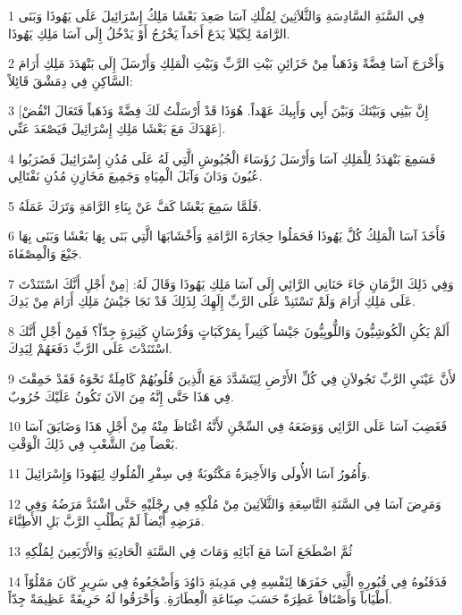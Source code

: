 \par 1 فِي السَّنَةِ السَّادِسَةِ وَالثَّلاَثِينَ لِمُلْكِ آسَا صَعِدَ بَعْشَا مَلِكُ إِسْرَائِيلَ عَلَى يَهُوذَا وَبَنَى الرَّامَةَ لِكَيْلاَ يَدَعَ أَحَداً يَخْرُجُ أَوْ يَدْخُلُ إِلَى آسَا مَلِكِ يَهُوذَا.
\par 2 وَأَخْرَجَ آسَا فِضَّةً وَذَهَباً مِنْ خَزَائِنِ بَيْتِ الرَّبِّ وَبَيْتِ الْمَلِكِ وَأَرْسَلَ إِلَى بَنْهَدَدَ مَلِكِ أَرَامَ السَّاكِنِ فِي دِمَشْقَ قَائِلاً:
\par 3 [إِنَّ بَيْنِي وَبَيْنَكَ وَبَيْنَ أَبِي وَأَبِيكَ عَهْداً. هُوَذَا قَدْ أَرْسَلْتُ لَكَ فِضَّةً وَذَهَباً فَتَعَالَ انْقُضْ عَهْدَكَ مَعَ بَعْشَا مَلِكِ إِسْرَائِيلَ فَيَصْعَدَ عَنِّي].
\par 4 فَسَمِعَ بَنْهَدَدُ لِلْمَلِكِ آسَا وَأَرْسَلَ رُؤَسَاءَ الْجُيُوشِ الَّتِي لَهُ عَلَى مُدُنِ إِسْرَائِيلَ فَضَرَبُوا عُيُونَ وَدَانَ وَآبَلَ الْمِيَاهِ وَجَمِيعَ مَخَازِنِ مُدُنِ نَفْتَالِي.
\par 5 فَلَمَّا سَمِعَ بَعْشَا كَفَّ عَنْ بِنَاءِ الرَّامَةِ وَتَرَكَ عَمَلَهُ.
\par 6 فَأَخَذَ آسَا الْمَلِكُ كُلَّ يَهُوذَا فَحَمَلُوا حِجَارَةَ الرَّامَةِ وَأَخْشَابَهَا الَّتِي بَنَى بِهَا بَعْشَا وَبَنَى بِهَا جَبْعَ وَالْمِصْفَاةَ.
\par 7 وَفِي ذَلِكَ الزَّمَانِ جَاءَ حَنَانِي الرَّائِي إِلَى آسَا مَلِكِ يَهُوذَا وَقَالَ لَهُ: [مِنْ أَجْلِ أَنَّكَ اسْتَنَدْتَ عَلَى مَلِكِ أَرَامَ وَلَمْ تَسْتَنِدْ عَلَى الرَّبِّ إِلَهِكَ لِذَلِكَ قَدْ نَجَا جَيْشُ مَلِكِ أَرَامَ مِنْ يَدِكَ.
\par 8 أَلَمْ يَكُنِ الْكُوشِيُّونَ وَاللُّوبِيُّونَ جَيْشاً كَثِيراً بِمَرْكَبَاتٍ وَفُرْسَانٍ كَثِيرَةٍ جِدّاً؟ فَمِنْ أَجْلِ أَنَّكَ اسْتَنَدْتَ عَلَى الرَّبِّ دَفَعَهُمْ لِيَدِكَ.
\par 9 لأَنَّ عَيْنَيِ الرَّبِّ تَجُولاَنِ فِي كُلِّ الأَرْضِ لِيَتَشَدَّدَ مَعَ الَّذِينَ قُلُوبُهُمْ كَامِلَةٌ نَحْوَهُ فَقَدْ حَمِقْتَ فِي هَذَا حَتَّى إِنَّهُ مِنَ الآنَ تَكُونُ عَلَيْكَ حُرُوبٌ.
\par 10 فَغَضِبَ آسَا عَلَى الرَّائِي وَوَضَعَهُ فِي السِّجْنِ لأَنَّهُ اغْتَاظَ مِنْهُ مِنْ أَجْلِ هَذَا وَضَايَقَ آسَا بَعْضاً مِنَ الشَّعْبِ فِي ذَلِكَ الْوَقْتِ.
\par 11 وَأُمُورُ آسَا الأُولَى وَالأَخِيرَةُ مَكْتُوبَةٌ فِي سِفْرِ الْمُلُوكِ لِيَهُوذَا وَإِسْرَائِيلَ.
\par 12 وَمَرِضَ آسَا فِي السَّنَةِ التَّاسِعَةِ وَالثَّلاَثِينَ مِنْ مُلْكِهِ فِي رِجْلَيْهِ حَتَّى اشْتَدَّ مَرَضُهُ وَفِي مَرَضِهِ أَيْضاً لَمْ يَطْلُبِ الرَّبَّ بَلِ الأَطِبَّاءَ.
\par 13 ثُمَّ اضْطَجَعَ آسَا مَعَ آبَائِهِ وَمَاتَ فِي السَّنَةِ الْحَادِيَةِ وَالأَرْبَعِينَ لِمُلْكِهِ
\par 14 فَدَفَنُوهُ فِي قُبُورِهِ الَّتِي حَفَرَهَا لِنَفْسِهِ فِي مَدِينَةِ دَاوُدَ وَأَضْجَعُوهُ فِي سَرِيرٍ كَانَ مَمْلُوّاً أَطْيَاباً وَأَصْنَافاً عَطِرَةً حَسَبَ صِنَاعَةِ الْعِطَارَةِ. وَأَحْرَقُوا لَهُ حَرِيقَةً عَظِيمَةً جِدّاً.

